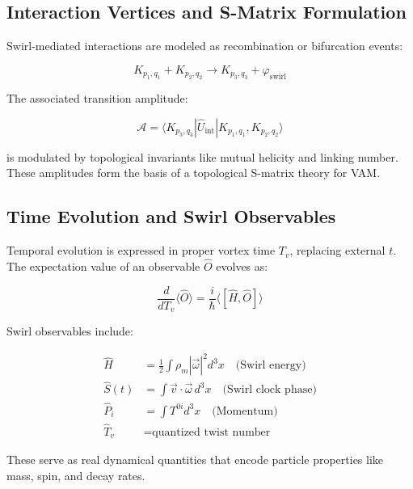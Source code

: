 \documentclass[preprint]{revtex4-2}
\begin{document}
    \subsection{Interaction Vertices and S-Matrix Formulation}
    Swirl-mediated interactions are modeled as recombination or bifurcation events:

    \begin{equation}
    K_{p_1,q_1} + K_{p_2,q_2} \rightarrow K_{p_3,q_3} + \varphi_{\text{swirl}}
    \end{equation}

    The associated transition amplitude:

    \begin{equation}
    \mathcal{A} = \langle K_{p_3,q_3} | \hat{U}_{\text{int}} | K_{p_1,q_1}, K_{p_2,q_2} \rangle
    \end{equation}

    is modulated by topological invariants like mutual helicity and linking number. These amplitudes form the basis of a topological S-matrix theory for VAM.

    \subsection{Time Evolution and Swirl Observables}

    Temporal evolution is expressed in proper vortex time \( T_v \), replacing external \( t \). The expectation value of an observable \( \hat{O} \) evolves as:

    \begin{equation}
    \frac{d}{dT_v} \langle \hat{O} \rangle = \frac{i}{\hbar} \langle [\hat{H}, \hat{O}] \rangle
    \end{equation}

    Swirl observables include:

    \begin{align}
    \hat{H} &= \frac{1}{2} \int \rho_{\scriptscriptstyle\boldsymbol\!m} |\vec{\omega}|^2 d^3x \quad \text{(Swirl energy)} \\
    \hat{S}(t) &= \int \vec{v} \cdot \vec{\omega} \, d^3x \quad \text{(Swirl clock phase)} \\
    \hat{P}_i &= \int T^{0i} d^3x \quad \text{(Momentum)} \\
    \hat{T}_v &= \text{quantized twist number}
    \end{align}

    These serve as real dynamical quantities that encode particle properties like mass, spin, and decay rates.
\end{document}

